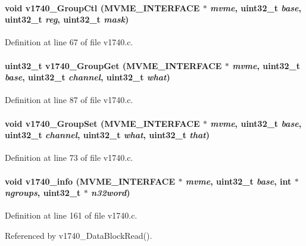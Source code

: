 \paragraph[{v1740\_\-GroupCtl}]{\setlength{\rightskip}{0pt plus 5cm}void v1740\_\-GroupCtl ({\bf MVME\_\-INTERFACE} $\ast$ {\em mvme}, \/  uint32\_\-t {\em base}, \/  uint32\_\-t {\em reg}, \/  uint32\_\-t {\em mask})}\hfill\label{v1740_8c_a45bbe7e39955954ac3835bb332ab3558}


Definition at line 67 of file v1740.c.
\paragraph[{v1740\_\-GroupGet}]{\setlength{\rightskip}{0pt plus 5cm}uint32\_\-t v1740\_\-GroupGet ({\bf MVME\_\-INTERFACE} $\ast$ {\em mvme}, \/  uint32\_\-t {\em base}, \/  uint32\_\-t {\em channel}, \/  uint32\_\-t {\em what})}\hfill\label{v1740_8c_a944b30b0d5a1020671125ffca5a73420}


Definition at line 87 of file v1740.c.
\paragraph[{v1740\_\-GroupSet}]{\setlength{\rightskip}{0pt plus 5cm}void v1740\_\-GroupSet ({\bf MVME\_\-INTERFACE} $\ast$ {\em mvme}, \/  uint32\_\-t {\em base}, \/  uint32\_\-t {\em channel}, \/  uint32\_\-t {\em what}, \/  uint32\_\-t {\em that})}\hfill\label{v1740_8c_aa7ab1ae041ccb35fea9b5174e1290a2e}


Definition at line 73 of file v1740.c.
\paragraph[{v1740\_\-info}]{\setlength{\rightskip}{0pt plus 5cm}void v1740\_\-info ({\bf MVME\_\-INTERFACE} $\ast$ {\em mvme}, \/  uint32\_\-t {\em base}, \/  int $\ast$ {\em ngroups}, \/  uint32\_\-t $\ast$ {\em n32word})}\hfill\label{v1740_8c_a6dbfbf9f82b07c28bdb78f514790a418}


Definition at line 161 of file v1740.c.

Referenced by v1740\_\-DataBlockRead().
